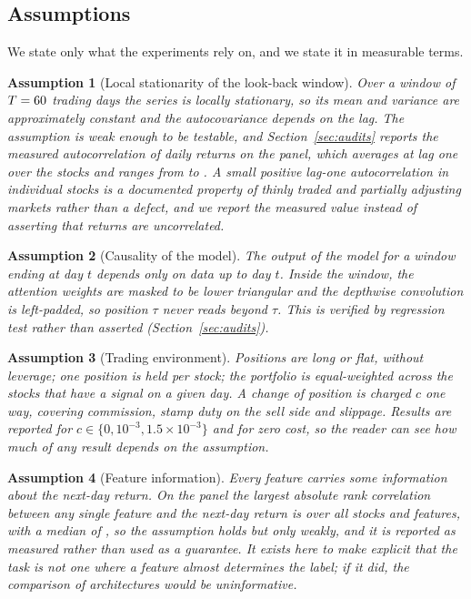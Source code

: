 \documentclass[pdflatex,sn-mathphys-ay]{sn-jnl}
\theoremstyle{thmstyleone}%
\newtheorem{Assumption}{Assumption}[section]%
\theoremstyle{thmstyletwo}%
\theoremstyle{thmstyletwo}%
\begin{document}
\subsection{Assumptions}

We state only what the experiments rely on, and we state it in measurable terms.

\begin{Assumption}[Local stationarity of the look-back window]\label{A1}
	Over a window of $T=60$ trading days the series is locally stationary, so its mean and
	variance are approximately constant and the autocovariance depends on the lag. The assumption is
	weak enough to be testable, and Section~\ref{sec:audits} reports the measured autocorrelation of
	daily returns on the panel, which averages \acfMean{} at lag one over the \nStocks{} stocks and
	ranges from \acfMin{} to \acfMax{}. A small positive lag-one autocorrelation in individual stocks
	is a documented property of thinly traded and partially adjusting markets rather than a defect,
	and we report the measured value instead of asserting that returns are uncorrelated.
\end{Assumption}

\begin{Assumption}[Causality of the model]\label{A4}
	The output of the model for a window ending at day $t$ depends only on data up to day $t$. Inside
	the window, the attention weights are masked to be lower triangular and the depthwise convolution
	is left-padded, so position $\tau$ never reads beyond $\tau$. This is verified by regression test
	rather than asserted (Section~\ref{sec:audits}).
\end{Assumption}

\begin{Assumption}[Trading environment]\label{A5}
	Positions are long or flat, without leverage; one position is held per stock; the portfolio is
	equal-weighted across the stocks that have a signal on a given day. A change of position is
	charged $c$ one way, covering commission, stamp duty on the sell side and slippage. Results are
	reported for $c \in \{0, 10^{-3}, 1.5\times10^{-3}\}$ and for zero cost, so the reader can see how
	much of any result depends on the assumption.
\end{Assumption}

\begin{Assumption}[Feature information]\label{A2}
	Every feature carries some information about the next-day return. On the panel the largest
	absolute rank correlation between any single feature and the next-day return is \maxRankCorr{}
	over all stocks and features, with a median of \medRankCorr{}, so the assumption holds but only
	weakly, and it is reported as measured rather than used as a guarantee. It exists here to make
	explicit that the task is not one where a feature almost determines the label; if it did, the
	comparison of architectures would be uninformative.
\end{Assumption}
\end{document}
